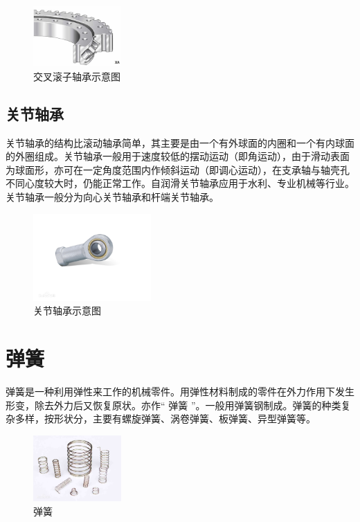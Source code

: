 \documentclass[UTF8]{article} %
\begin{document}
\begin{figure}[h]
  \centering
  \includegraphics[width=0.3\textwidth]{zhou8.png}
  \caption{交叉滚子轴承示意图}
\end{figure}

\subsection{关节轴承}
关节轴承的结构比滚动轴承简单，其主要是由一个有外球面的内圈和一个有内球面的外圈组成。关节轴承一般用于速度较低的摆动运动（即角运动），由于滑动表面为球面形，亦可在一定角度范围内作倾斜运动（即调心运动），在支承轴与轴壳孔不同心度较大时，仍能正常工作。自润滑关节轴承应用于水利、专业机械等行业。关节轴承一般分为向心关节轴承和杆端关节轴承。

\begin{figure}[h]
  \centering
  \includegraphics[width=0.4\textwidth]{zhou9.png}
  \caption{关节轴承示意图}
\end{figure}

\section{弹簧}

弹簧是一种利用弹性来工作的机械零件。用弹性材料制成的零件在外力作用下发生形变，除去外力后又恢复原状。亦作“ 弹簧 ”。一般用弹簧钢制成。弹簧的种类复杂多样，按形状分，主要有螺旋弹簧、涡卷弹簧、板弹簧、异型弹簧等。

\begin{figure}[h]
  \centering
  \includegraphics[width=0.3\textwidth]{th1.png}
  \caption{弹簧}
\end{figure}
\end{document}
